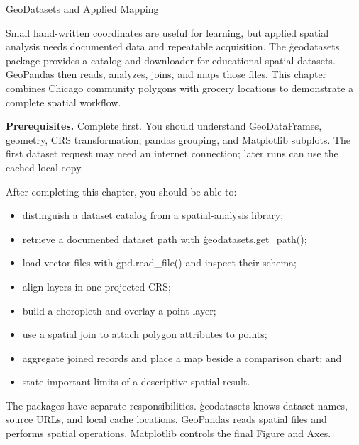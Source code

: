 
\h{GeoDatasets and Applied Mapping}
\label{ch:15}

Small hand-written coordinates are useful for learning, but applied spatial
analysis needs documented data and repeatable acquisition. The
\c{geodatasets} package provides a catalog and downloader for educational
spatial datasets. GeoPandas then reads, analyzes, joins, and maps those files.
This chapter combines Chicago community polygons with grocery locations to
demonstrate a complete spatial workflow.

\begin{NoteBox}
\textbf{Prerequisites.} Complete  first. You should
understand GeoDataFrames, geometry, CRS transformation, pandas grouping, and
Matplotlib subplots. The first dataset request may need an internet connection;
later runs can use the cached local copy.
\end{NoteBox}

\begin{tcolorbox}[title=Learning outcomes,colframe=orange,colback=white,arc=2mm]
After completing this chapter, you should be able to:
\begin{itemize}
    \item distinguish a dataset catalog from a spatial-analysis library;
    \item retrieve a documented dataset path with \c{geodatasets.get_path()};
    \item load vector files with \c{gpd.read_file()} and inspect their schema;
    \item align layers in one projected CRS;
    \item build a choropleth and overlay a point layer;
    \item use a spatial join to attach polygon attributes to points;
    \item aggregate joined records and place a map beside a comparison chart;
          and
    \item state important limits of a descriptive spatial result.
\end{itemize}
\end{tcolorbox}


The packages have separate responsibilities. \c{geodatasets} knows dataset
names, source URLs, and local cache locations. GeoPandas reads spatial files
and performs spatial operations. Matplotlib controls the final Figure and Axes.

